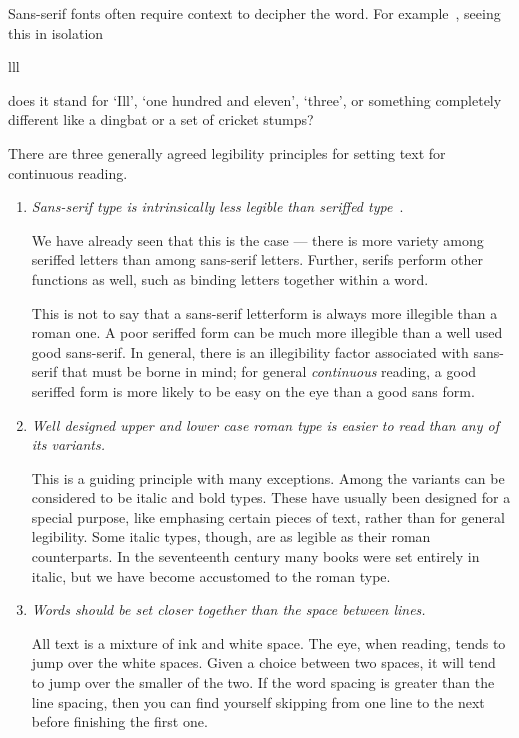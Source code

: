 \documentclass[10pt,letterpaper]{memoir}
\begin{document}
    Sans-serif fonts often require context to decipher the word. 
For example~\cite{MCLEAN80},
seeing this in isolation
\begin{center}
{\Huge\sffamily lll}
\end{center}
does it stand for `Ill', `one hundred and eleven', `three', or something
completely different like a dingbat or a set of cricket stumps?

    
    There are three generally agreed legibility principles for setting text for
continuous reading.

\begin{enumerate}
\item \emph{Sans-serif type is intrinsically less legible than seriffed type}~\cite{WHEILDON95}.

    We have already seen that this is the case --- there is more variety
among seriffed letters than among sans-serif letters. Further, serifs
perform other functions as well, such as binding letters together within
a word.

    This is not to say that a sans-serif letterform is always more illegible
than a roman one. A poor seriffed form can be much more illegible than
a well used good sans-serif. In general, there is an illegibility factor
associated with sans-serif that must be borne in mind; for general
\emph{continuous} reading, a good seriffed form is more likely to be
easy on the eye than a good sans form.

\item \emph{Well designed upper and lower case roman type is easier to read than
any of its variants.}

    This is a guiding principle with many exceptions. Among the variants
can be considered to be italic and bold types. These have usually been
designed for a special purpose, like emphasing 
certain pieces of text, rather
than for general legibility. Some italic types, though, are as legible as their
roman counterparts. In the seventeenth century many books were set entirely
in italic, but we have become accustomed to the roman type.

\item \emph{Words should be set closer together than the space between lines.}

    All text is a mixture of ink and white space. The eye, when reading, 
tends to jump over the white spaces. Given a choice between two spaces, it 
will tend to jump over the smaller of the two. If the word spacing is greater
than the line spacing, then you can find yourself skipping from one line
to the next before finishing the first one.


\end{enumerate}
\end{document}
